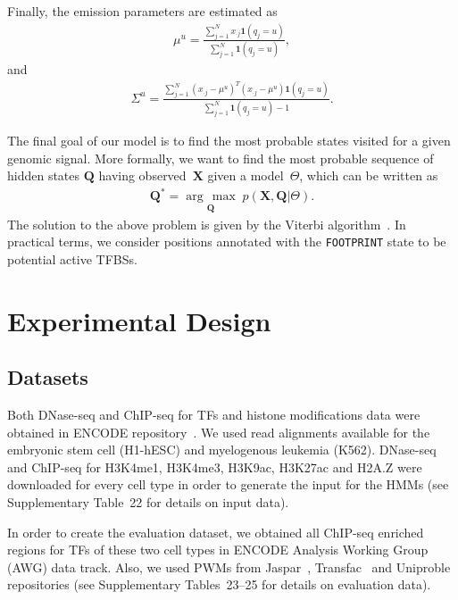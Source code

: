 \documentclass{bioinfo}
\newcommand{\argmax}[1]{\underset{#1}{\operatorname{arg}\,\operatorname{max}}\;}
\begin{document}
\begin{methods}
Finally, the emission parameters are estimated as
\begin{align}
\mu^{u} = \frac{ \sum_{j=1}^{N} {x}_{\cdot j} {\mathbf{1}}(q_j=u) }{ \sum_{j=1}^{N} {\mathbf{1}} (q_j=u) },
    \label{eq:train2}
\end{align}
and
\begin{align}
    {\Sigma}^{u} =  \frac{ \sum_{j=1}^{N} ({x}_{\cdot j} - {\mu}^{u})^T({x}_{\cdot j} - {\mu}^{u}) {\mathbf{1}} (q_j=u)}
                         { \sum_{j=1}^{N} {\mathbf{1}} (q_j=u)  - 1}.
    \label{eq:train3}
\end{align}

The final goal of our model is to find the most probable states
visited for a given genomic signal. More formally, we want to find the
most probable sequence of hidden states $ \mathbf{Q}$ having
observed~$\mathbf{X}$ given a model~$ \Theta$, which can be written as
\begin{align}
    \mathbf{Q^*} = \argmax{\mathbf{Q}} p\left(\mathbf{X},\mathbf{Q}|\Theta\right).
    \label{eq:viterbi1}
\end{align}
The solution to the above problem is given by the Viterbi algorithm~\citep{rabiner1989}.
In practical terms, we consider positions annotated with the {\tt FOOTPRINT}
state to be potential active TFBSs.

\section{Experimental Design}
\label{sec:experimental.design}

\subsection{Datasets}
\label{sec:datasets}

Both DNase-seq and ChIP-seq for TFs and histone modifications data were obtained
in ENCODE repository~\citep{encode2012}. We used read alignments available for
the embryonic stem cell (H1-hESC) and myelogenous leukemia (K562). DNase-seq and
ChIP-seq for H3K4me1, H3K4me3, H3K9ac, H3K27ac and H2A.Z were downloaded for every
cell type in order to generate the input for the HMMs (see Supplementary {\color{red} Table~22}
for details on input data).

In order to create the evaluation dataset, we obtained all ChIP-seq enriched
regions for TFs of these two cell types in ENCODE Analysis Working Group (AWG) data track.
Also, we used PWMs from Jaspar~\citep{mathelier2014}, Transfac~\citep{matys2006}
and Uniproble~\citep{robasky2011} repositories (see Supplementary {\color{red} Tables~23--25}
for details on evaluation data).


\end{methods}
\end{document}
